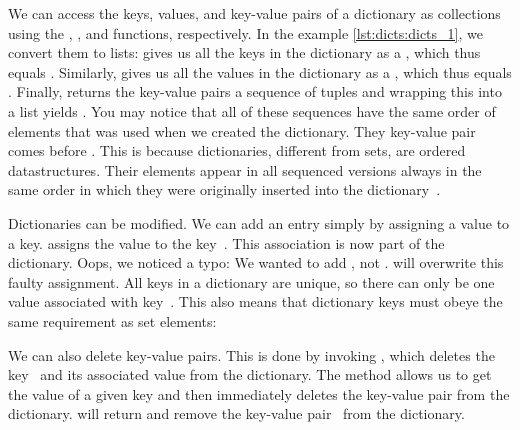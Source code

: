 \begin{sloppypar}%
We can access the keys, values, and key-value pairs of a dictionary as collections using the , , and  functions, respectively.
In the example \cref{lst:dicts:dicts_1}, we convert them to lists:
 gives us all the keys in the dictionary  as a , which thus equals \pythonil{[2, 1, 3, 4]}.
Similarly,  gives us all the values in the dictionary  as a , which thus equals .
Finally,  returns the key-value pairs a sequence of tuples and wrapping this into a list yields .
You may notice that all of these sequences have the same order of elements that was used when we created the dictionary.
They key-value pair  comes before .
This is because dictionaries, different from sets, are ordered datastructures.
Their elements appear in all sequenced versions always in the same order in which they were originally inserted into the dictionary~\cite{PSF2024D}.%
\end{sloppypar}%
%
\begin{sloppypar}%
Dictionaries can be modified.
We can add an entry simply by assigning a value to a key.
 assigns the value  to the key~.
This association is now part of the dictionary.
Oops, we noticed a typo:
We wanted to add , not .
 will overwrite this faulty assignment.
All keys in a dictionary are unique, so there can only be one value associated with key~.
This also means that dictionary keys must obeye the same requirement as set elements:%
\end{sloppypar}%
%
%
%
We can also delete key-value pairs.
This is done by invoking , which deletes the key~ and its associated value from the dictionary.
The method  allows us to get the value of a given key and then immediately deletes the key-value pair from the dictionary.
 will return  and remove the key-value pair~ from the dictionary.
